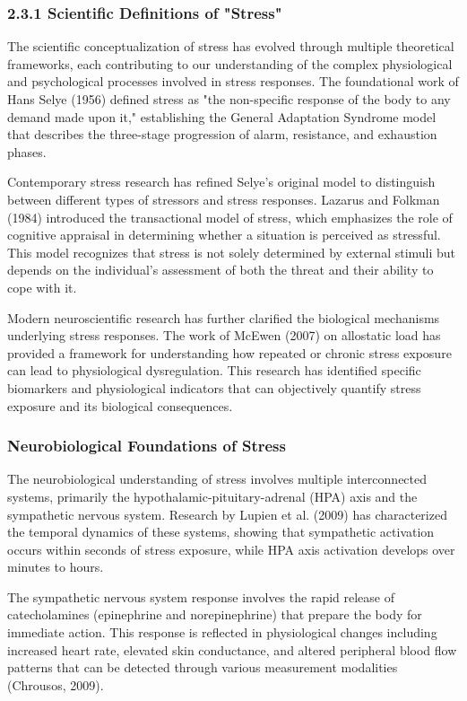 \documentclass[11pt,a4paper]{article}
\begin{document}
\subsubsection{2.3.1 Scientific Definitions of "Stress"}

The scientific conceptualization of stress has evolved through multiple theoretical frameworks, each contributing to our
understanding of the complex physiological and psychological processes involved in stress responses. The foundational
work of Hans Selye (1956) defined stress as "the non-specific response of the body to any demand made upon it,"
establishing the General Adaptation Syndrome model that describes the three-stage progression of alarm, resistance, and
exhaustion phases.

Contemporary stress research has refined Selye's original model to distinguish between different types of stressors and
stress responses. Lazarus and Folkman (1984) introduced the transactional model of stress, which emphasizes the role of
cognitive appraisal in determining whether a situation is perceived as stressful. This model recognizes that stress is
not solely determined by external stimuli but depends on the individual's assessment of both the threat and their
ability to cope with it.

Modern neuroscientific research has further clarified the biological mechanisms underlying stress responses. The work of
McEwen (2007) on allostatic load has provided a framework for understanding how repeated or chronic stress exposure can
lead to physiological dysregulation. This research has identified specific biomarkers and physiological indicators that
can objectively quantify stress exposure and its biological consequences.

\subsubsection{Neurobiological Foundations of Stress}

The neurobiological understanding of stress involves multiple interconnected systems, primarily the
hypothalamic-pituitary-adrenal (HPA) axis and the sympathetic nervous system. Research by Lupien et al. (2009) has
characterized the temporal dynamics of these systems, showing that sympathetic activation occurs within seconds of
stress exposure, while HPA axis activation develops over minutes to hours.

The sympathetic nervous system response involves the rapid release of catecholamines (epinephrine and norepinephrine)
that prepare the body for immediate action. This response is reflected in physiological changes including increased
heart rate, elevated skin conductance, and altered peripheral blood flow patterns that can be detected through various
measurement modalities (Chrousos, 2009).
\end{document}
